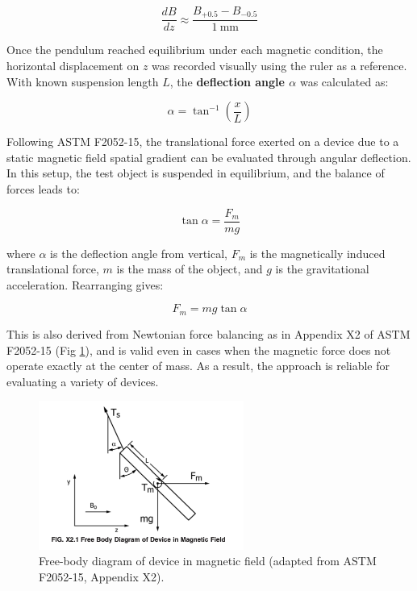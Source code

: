 \begin{equation}
	\frac{dB}{dz} \approx \frac{B_{+0.5} - B_{-0.5}}{1\ \text{mm}}
\end{equation}

Once the pendulum reached equilibrium under each magnetic condition, the horizontal displacement on $z$ was recorded visually using the ruler as a reference. With known suspension length $L$, the \textbf{deflection angle $\alpha$} was calculated as:

\begin{equation}
	\alpha = \tan^{-1}\left(\frac{x}{L}\right)
\end{equation}

Following ASTM F2052-15, the translational force exerted on a device due to a static magnetic field spatial gradient can be evaluated through angular deflection. In this setup, the test object is suspended in equilibrium, and the balance of forces leads to:

\begin{equation}
	\tan \alpha = \frac{F_m}{mg}
\end{equation}

where $\alpha$ is the deflection angle from vertical, $F_m$ is the magnetically induced translational force, $m$ is the mass of the object, and $g$ is the gravitational acceleration. Rearranging gives:

\begin{equation}
	F_m = mg \tan \alpha
\end{equation}

This is also derived from Newtonian force balancing as in Appendix X2 of ASTM F2052-15 (Fig \ref{fig:astm_diagram}), and is valid even in cases when the magnetic force does not operate exactly at the center of mass. As a result, the approach is reliable for evaluating a variety of devices.

\begin{figure}[htbp]
	\centering
	\includegraphics[width=0.6\textwidth]{Assests/astm_diagram.png}
	\caption{Free-body diagram of device in magnetic field (adapted from ASTM F2052-15, Appendix X2).}
	\label{fig:astm_diagram}
\end{figure}

